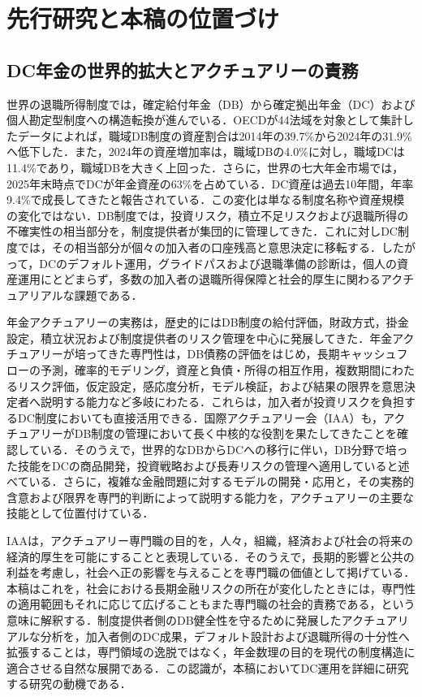\documentclass[10pt,a4paper]{article}
\theoremstyle{plain}
\theoremstyle{definition}
\begin{document}
\FloatBarrier\clearpage\appendix
\small
\setlength{\abovedisplayskip}{4pt plus 1pt}
\setlength{\belowdisplayskip}{4pt plus 1pt}

\section{先行研究と本稿の位置づけ}
\label{sec:literature}
\subsection{DC年金の世界的拡大とアクチュアリーの責務}

世界の退職所得制度では，確定給付年金（DB）から確定拠出年金（DC）および個人勘定型制度への構造転換が進んでいる．OECDが44法域を対象として集計したデータによれば，職域DB制度の資産割合は2014年の39.7\%から2024年の31.9\%へ低下した．また，2024年の資産増加率は，職域DBの4.0\%に対し，職域DCは11.4\%であり，職域DBを大きく上回った\citep{OECD2025PensionMarkets}．さらに，世界の七大年金市場では，2025年末時点でDCが年金資産の63\%を占めている．DC資産は過去10年間，年率9.4\%で成長してきたと報告されている\citep{TAI2026GPAS}．この変化は単なる制度名称や資産規模の変化ではない．DB制度では，投資リスク，積立不足リスクおよび退職所得の不確実性の相当部分を，制度提供者が集団的に管理してきた．これに対しDC制度では，その相当部分が個々の加入者の口座残高と意思決定に移転する．したがって，DCのデフォルト運用，グライドパスおよび退職準備の診断は，個人の資産運用にとどまらず，多数の加入者の退職所得保障と社会的厚生に関わるアクチュアリアルな課題である．

年金アクチュアリーの実務は，歴史的にはDB制度の給付評価，財政方式，掛金設定，積立状況および制度提供者のリスク管理を中心に発展してきた．年金アクチュアリーが培ってきた専門性は，DB債務の評価をはじめ，長期キャッシュフローの予測，確率的モデリング，資産と負債・所得の相互作用，複数期間にわたるリスク評価，仮定設定，感応度分析，モデル検証，および結果の限界を意思決定者へ説明する能力など多岐にわたる．これらは，加入者が投資リスクを負担するDC制度においても直接活用できる．国際アクチュアリー会（IAA）も，アクチュアリーがDB制度の管理において長く中核的な役割を果たしてきたことを確認している．そのうえで，世界的なDBからDCへの移行に伴い，DB分野で培った技能をDCの商品開発，投資戦略および長寿リスクの管理へ適用していると述べている\citep{IAA2021DCRoadmap}．さらに，複雑な金融問題に対するモデルの開発・応用と，その実務的含意および限界を専門的判断によって説明する能力を，アクチュアリーの主要な技能として位置付けている\citep{IAA2013Role}．

IAAは，アクチュアリー専門職の目的を，人々，組織，経済および社会の将来の経済的厚生を可能にすることと表現している．そのうえで，長期的影響と公共の利益を考慮し，社会へ正の影響を与えることを専門職の価値として掲げている\citep{IAA2016Profession}．本稿はこれを，社会における長期金融リスクの所在が変化したときには，専門性の適用範囲もそれに応じて広げることもまた専門職の社会的責務である，という意味に解釈する．制度提供者側のDB健全性を守るために発展したアクチュアリアルな分析を，加入者側のDC成果，デフォルト設計および退職所得の十分性へ拡張することは，専門領域の逸脱ではなく，年金数理の目的を現代の制度構造に適合させる自然な展開である．この認識が，本稿においてDC運用を詳細に研究する研究の動機である．
\end{document}
